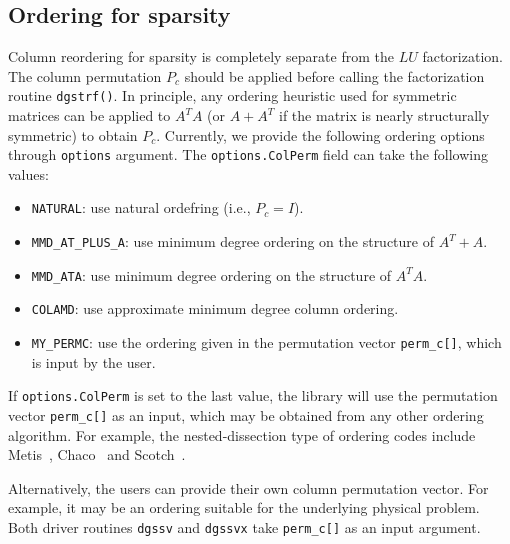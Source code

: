 \subsection{Ordering for sparsity}
\label{sec:permX}
Column reordering for sparsity is completely separate from the $LU$ 
factorization. The column permutation $P_c$ should be applied before
calling the factorization routine {\tt dgstrf()}. In principle, any ordering
heuristic used for symmetric matrices can be applied to $A^TA$ 
(or $A+A^T$ if the matrix is nearly structurally symmetric) to obtain $P_c$.
Currently, we provide the following ordering options through {\tt options}
argument. The {\tt options.ColPerm} field can take the following values:
\begin{itemize}
\item {\tt NATURAL}: use natural ordefring (i.e., $P_c = I$).
\item {\tt MMD\_AT\_PLUS\_A}: use minimum degree ordering on the
			structure of $A^T+A$.
\item {\tt MMD\_ATA}: use minimum degree ordering on the structure of $A^TA$.
\item {\tt COLAMD}: use approximate minimum degree column ordering.
\item {\tt MY\_PERMC}: use the ordering given in the permutation
               vector {\tt perm\_c[]}, which is input by the user.
\end{itemize}


If {\tt options.ColPerm} is set to the last value, the library will use
the permutation vector {\tt perm\_c[]} as an input, which may be obtained
from any other ordering algorithm. For example, the nested-dissection type
of ordering codes include
Metis~\cite{kaku:98a}, Chaco~\cite{hele:95} and Scotch~\cite{scotch}.

Alternatively, the users can provide their own column permutation vector.
For example, it may be an ordering suitable for the underlying physical
problem. Both driver routines {\tt dgssv} and {\tt dgssvx} take 
{\tt perm\_c[]} as an input argument.

